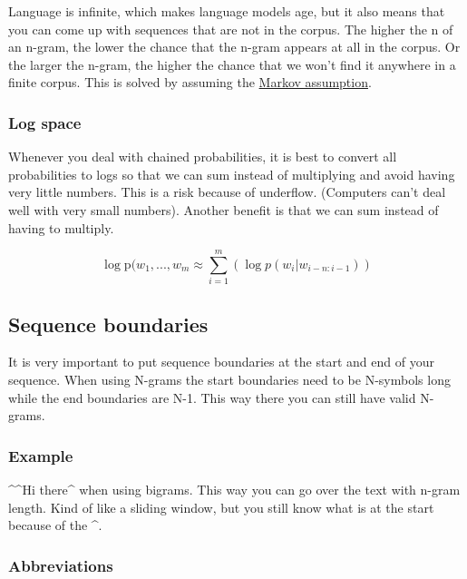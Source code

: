 \documentclass[
  11pt,
  british,
]{article}
\begin{document}
Language is infinite, which makes language models age, but it also means
that you can come up with sequences that are not in the corpus. The
higher the n of an n-gram, the lower the chance that the n-gram appears
at all in the corpus. Or the larger the n-gram, the higher the chance
that we won't find it anywhere in a finite corpus. This is solved by
assuming the \href{../Prediction/Markov\%20assumption.md}{Markov
assumption}.

\hypertarget{log-space}{%
\subsubsection{Log space}\label{log-space}}

Whenever you deal with chained probabilities, it is best to convert all
probabilities to logs so that we can sum instead of multiplying and
avoid having very little numbers. This is a risk because of underflow.
(Computers can't deal well with very small numbers). Another benefit is
that we can sum instead of having to multiply.

\[\log \text{p}(w_{1},...,w_{m} \approx \sum\limits^{m}_{i=1} (\log p(w_{i}|w_{i-n:i-1}))\]

\hypertarget{sequence-boundaries}{%
\subsection{Sequence boundaries}\label{sequence-boundaries}}

It is very important to put sequence boundaries at the start and end of
your sequence. When using N-grams the start boundaries need to be
N-symbols long while the end boundaries are N-1. This way there you can
still have valid N-grams.

\hypertarget{example-8}{%
\subsubsection{Example}\label{example-8}}

\^{}\^{}Hi there\^{} when using bigrams. This way you can go over the
text with n-gram length. Kind of like a sliding window, but you still
know what is at the start because of the \^{}.

\hypertarget{abbreviations}{%
\subsubsection{Abbreviations}\label{abbreviations}}
\end{document}
